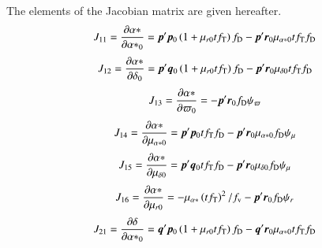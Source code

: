 \documentclass{aa}
\def\vec#1{\ensuremath{\mathchoice{\mbox{\boldmath$\displaystyle#1$}}
{\mbox{\boldmath$\textstyle#1$}}
{\mbox{\boldmath$\scriptstyle#1$}}
{\mbox{\boldmath$\scriptscriptstyle#1$}}}}
\begin{document}
The elements of the Jacobian matrix are given hereafter.
\begin{equation*}
 \begin{aligned}
    J_{11}=\frac{\partial\alpha*}{\partial{\alpha*}_0}=
    \vec{p}'\vec{p}_0\left(1+\mu_{r0}tf_\mathrm{T}\right)f_\mathrm{D}
    -\vec{p}'\vec{r}_0\mu_{\alpha*0}tf_\mathrm{T}f_\mathrm{D}
 \end{aligned}
\end{equation*}
\begin{equation*}
 \begin{aligned}
    J_{12}=\frac{\partial\alpha*}{\partial\delta_0}=
    \vec{p}'\vec{q}_0\left(1+\mu_{r0}tf_\mathrm{T}\right)f_\mathrm{D}
    -\vec{p}'\vec{r}_0\mu_{\delta0}tf_\mathrm{T}f_\mathrm{D}
 \end{aligned}
\end{equation*}
\begin{equation*}
 \begin{aligned}
    J_{13}=\frac{\partial\alpha*}{\partial\varpi_0}=
    -\vec{p}'\vec{r}_0f_\mathrm{D}\psi_\varpi
 \end{aligned}
\end{equation*}
\begin{equation*}
 \begin{aligned}
    J_{14}=\frac{\partial\alpha*}{\partial\mu_{\alpha*0}}=
    \vec{p}'\vec{p}_0tf_\mathrm{T}f_\mathrm{D}
    -\vec{p}'\vec{r}_0\mu_{\alpha*0}f_\mathrm{D}\psi_\mu
 \end{aligned}
\end{equation*}
\begin{equation*}
 \begin{aligned}
    J_{15}=\frac{\partial\alpha*}{\partial\mu_{\delta0}}=
    \vec{p}'\vec{q}_0tf_\mathrm{T}f_\mathrm{D}
    -\vec{p}'\vec{r}_0\mu_{\delta0}f_\mathrm{D}\psi_\mu
 \end{aligned}
\end{equation*}
\begin{equation*}
 \begin{aligned}
    J_{16}=\frac{\partial\alpha*}{\partial\mu_{r0}}=
    -\mu_{\alpha*}\left(tf_\mathrm{T}\right)^2/f_\mathrm v
    -\vec{p}'\vec{r}_0f_\mathrm{D}\psi_r
 \end{aligned}
\end{equation*}
\begin{equation*}
 \begin{aligned}
    J_{21}=\frac{\partial\delta}{\partial{\alpha*}_0}=
    \vec{q}'\vec{p}_0\left(1+\mu_{r0}tf_\mathrm{T}\right)f_\mathrm{D}
    -\vec{q}'\vec{r}_0\mu_{\alpha*0}tf_\mathrm{T}f_\mathrm{D}
 \end{aligned}
\end{equation*}
\end{document}
